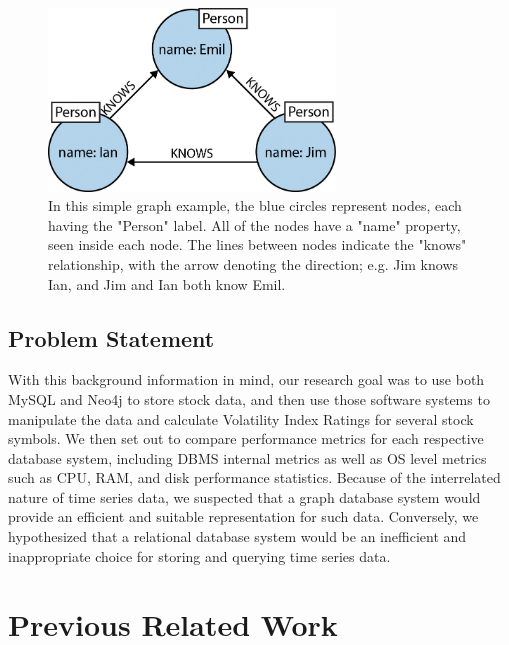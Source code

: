 \documentclass{IEEEtran}
\begin{document}
\begin{figure}
	\centering
	\includegraphics[width=3in]{Images/graphdb_simple_example.jpg}
	\caption{In this simple graph example, the blue circles represent nodes, each having the "Person" label. All of the nodes have a "name" property, seen inside each node. The lines between nodes indicate the "knows" relationship, with the arrow denoting the direction; e.g. Jim knows Ian, and Jim and Ian both know Emil.}
	\label{fig:graphdb_ex}
\end{figure} 

\subsection{Problem Statement}

With this background information in mind, our research goal was to use both MySQL and Neo4j to store stock data, and then use those software systems to manipulate the data and calculate Volatility Index Ratings for several stock symbols. We then set out to compare performance metrics for each respective database system, including DBMS internal metrics as well as OS level metrics such as CPU, RAM, and disk performance statistics. Because of the interrelated nature of time series data, we suspected that a graph database system would provide an efficient and suitable representation for such data. Conversely, we hypothesized that a relational database system would be an inefficient and inappropriate choice for storing and querying time series data.  

\section{Previous Related Work}
\end{document}
